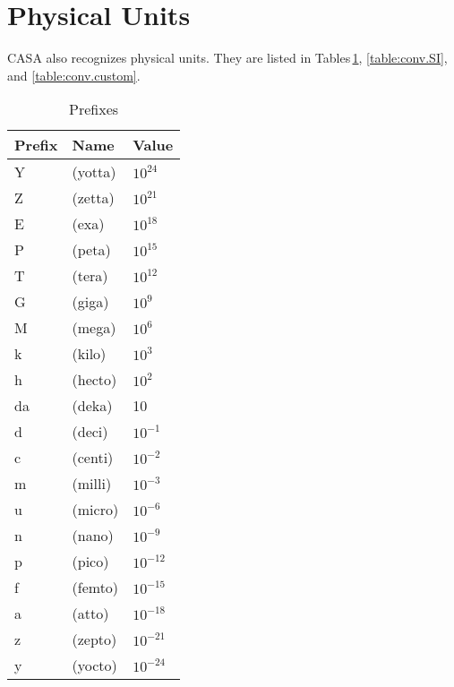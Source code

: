\section{Physical Units}

\label{section:conv.units}

CASA also recognizes physical units. They are listed in
Tables\,\ref{table:conv.prefixes}, \ref{table:conv.SI},
and \ref{table:conv.custom}.

\begin{table}[htb]
\caption{Prefixes \label{table:conv.prefixes}}
\begin{center}
\begin{tabular}{lll}
Prefix & Name & Value\\
\hline
    Y  &         (yotta)  &                    $10^{24}$\\
    Z  &         (zetta)  &                    $10^{21}$\\
    E  &         (exa)    &                    $10^{18}$ \\
    P  &         (peta)   &                    $10^{15}$\\
    T  &         (tera)   &                    $10^{12}$\\
    G  &         (giga)   &                    $10^{9}$\\
    M  &         (mega)   &                    $10^{6}$\\
    k  &         (kilo)   &                    $10^{3}$\\
    h  &         (hecto)  &                    $10^{2}$\\
    da &         (deka)   &                    10\\
    d  &         (deci)   &                    $10^{-1}$\\
    c  &         (centi)  &                    $10^{-2}$\\
    m  &         (milli)  &                    $10^{-3}$\\
    u  &         (micro)  &                    $10^{-6}$\\
    n  &         (nano)   &                    $10^{-9}$\\
    p  &         (pico)   &                    $10^{-12}$\\
    f  &         (femto)  &                    $10^{-15}$\\
    a  &         (atto)   &                    $10^{-18}$\\
    z  &         (zepto)  &                    $10^{-21}$\\
    y  &         (yocto)  &                    $10^{-24}$\\

\end{tabular}
\end{center}
\end{table}




